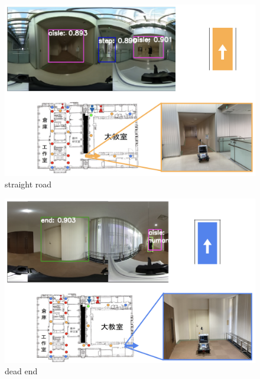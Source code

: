 \documentclass[../main]{subfiles}
\begin{document}
        \begin{figure}[H]
            \centering
            \includegraphics[scale=0.5]{../images/experiment_straight_road.png}
            \caption{straight road}
        \end{figure}
             
        \begin{figure}[H]
            \centering
            \includegraphics[scale=0.5]{../images/experiment_end.png}
            \caption{dead end}
            \label{figure::deadend}
        \end{figure}  
\end{document}
